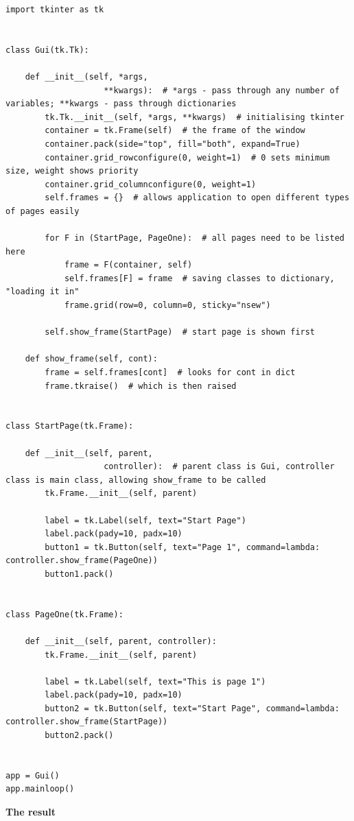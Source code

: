 \documentclass[11pt, a4paper]{article}
\begin{document}
\begin{lstlisting}
import tkinter as tk


class Gui(tk.Tk):

    def __init__(self, *args,
                    **kwargs):  # *args - pass through any number of variables; **kwargs - pass through dictionaries
        tk.Tk.__init__(self, *args, **kwargs)  # initialising tkinter
        container = tk.Frame(self)  # the frame of the window
        container.pack(side="top", fill="both", expand=True)
        container.grid_rowconfigure(0, weight=1)  # 0 sets minimum size, weight shows priority
        container.grid_columnconfigure(0, weight=1)
        self.frames = {}  # allows application to open different types of pages easily

        for F in (StartPage, PageOne):  # all pages need to be listed here
            frame = F(container, self)
            self.frames[F] = frame  # saving classes to dictionary, "loading it in"
            frame.grid(row=0, column=0, sticky="nsew")

        self.show_frame(StartPage)  # start page is shown first

    def show_frame(self, cont):
        frame = self.frames[cont]  # looks for cont in dict
        frame.tkraise()  # which is then raised


class StartPage(tk.Frame):

    def __init__(self, parent,
                    controller):  # parent class is Gui, controller class is main class, allowing show_frame to be called
        tk.Frame.__init__(self, parent)

        label = tk.Label(self, text="Start Page")
        label.pack(pady=10, padx=10)
        button1 = tk.Button(self, text="Page 1", command=lambda: controller.show_frame(PageOne))
        button1.pack()


class PageOne(tk.Frame):

    def __init__(self, parent, controller):
        tk.Frame.__init__(self, parent)

        label = tk.Label(self, text="This is page 1")
        label.pack(pady=10, padx=10)
        button2 = tk.Button(self, text="Start Page", command=lambda: controller.show_frame(StartPage))
        button2.pack()


app = Gui()
app.mainloop()
\end{lstlisting}
\textbf{The result}
\end{document}

